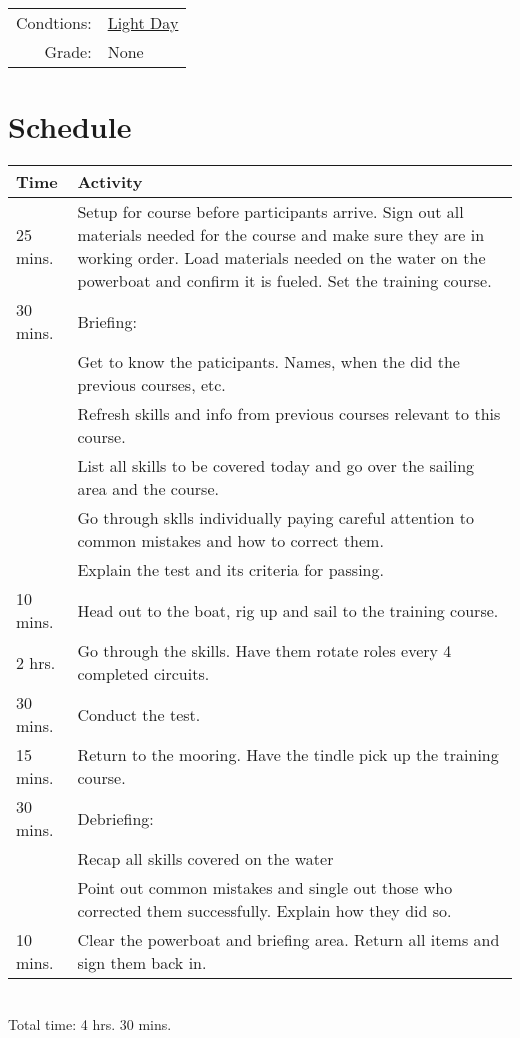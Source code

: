 \documentclass[12pt]{scrartcl}
\begin{document}
\label{tab:requirements}
\begin{tabular}{rl}
	Condtions: & \hyperlink{condition:light}{Light Day} \\
	Grade: & None \\
\end{tabular}

\newpage

\section{Schedule} \label{sec:schedule}

\label{tab:schedule}
\begin{tabularx}{\textwidth}{|X|X|}
	\hline
	\textbf{Time} & \textbf{Activity} \\
	\hline
	25 mins. & Setup for course before participants arrive. Sign out all materials needed for the course and make sure they are in working order. Load materials needed on the water on the powerboat and confirm it is fueled. Set the training course. \\
	\hline
	30 mins. & Briefing: \\
	& Get to know the paticipants. Names, when the did the previous courses, etc. \\
	& Refresh skills and info from previous courses relevant to this course. \\
	& List all skills to be covered today and go over the sailing area and the course. \\
	& Go through sklls individually paying careful attention to common mistakes and how to correct them. \\
	& Explain the test and its criteria for passing. \\
	\hline
	10 mins. & Head out to the boat, rig up and sail to the training course. \\
	\hline
	2 hrs. & Go through the skills. Have them rotate roles every 4 completed circuits. \\
	\hline
	30 mins. & Conduct the test. \\
	\hline
	15 mins. & Return to the mooring. Have the tindle pick up the training course. \\
	\hline
	30 mins. & Debriefing: \\
	& Recap all skills covered on the water \\
	& Point out common mistakes and single out those who corrected them successfully. Explain how they did so. \\
	\hline
	10 mins. & Clear the powerboat and briefing area. Return all items and sign them back in. \\
	\hline
\end{tabularx}
\\
Total time: 4 hrs. 30 mins.
\end{document}
